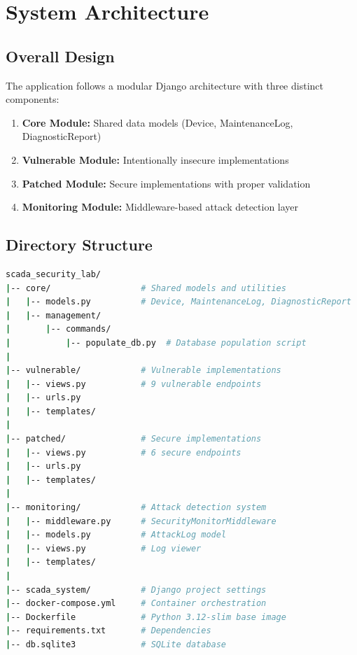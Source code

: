 \documentclass[12pt,a4paper]{article}
\begin{document}
\newpage

\section{System Architecture}

\subsection{Overall Design}

The application follows a modular Django architecture with three distinct components:

\begin{enumerate}[leftmargin=*]
    \item \textbf{Core Module:} Shared data models (Device, MaintenanceLog, DiagnosticReport)
    \item \textbf{Vulnerable Module:} Intentionally insecure implementations
    \item \textbf{Patched Module:} Secure implementations with proper validation
    \item \textbf{Monitoring Module:} Middleware-based attack detection layer
\end{enumerate}

\subsection{Directory Structure}

\begin{lstlisting}[language=bash]
scada_security_lab/
|-- core/                  # Shared models and utilities
|   |-- models.py          # Device, MaintenanceLog, DiagnosticReport
|   |-- management/
|       |-- commands/
|           |-- populate_db.py  # Database population script
|
|-- vulnerable/            # Vulnerable implementations
|   |-- views.py           # 9 vulnerable endpoints
|   |-- urls.py
|   |-- templates/
|
|-- patched/               # Secure implementations
|   |-- views.py           # 6 secure endpoints
|   |-- urls.py
|   |-- templates/
|
|-- monitoring/            # Attack detection system
|   |-- middleware.py      # SecurityMonitorMiddleware
|   |-- models.py          # AttackLog model
|   |-- views.py           # Log viewer
|   |-- templates/
|
|-- scada_system/          # Django project settings
|-- docker-compose.yml     # Container orchestration
|-- Dockerfile             # Python 3.12-slim base image
|-- requirements.txt       # Dependencies
|-- db.sqlite3             # SQLite database
\end{lstlisting}
\end{document}
